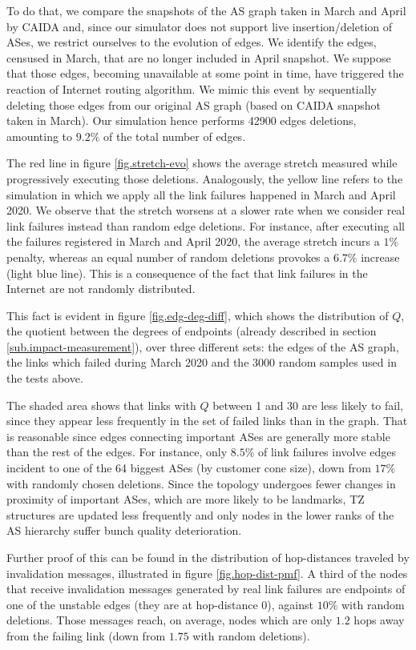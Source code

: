 \documentclass[a4paper,11pt,oneside]{report}
\begin{document}
To do that, we compare the snapshots of the AS graph taken in March and April by CAIDA and, since our simulator does not support live insertion/deletion of ASes, we restrict ourselves to the evolution of edges. We identify the edges, censused in March, that are no longer included in April snapshot. We suppose that those edges, becoming unavailable at some point in time, have triggered the reaction of Internet routing algorithm. We mimic this event by sequentially deleting those edges from our original AS graph (based on CAIDA snapshot taken in March). Our simulation hence performs 42900 edges deletions, amounting to $9.2\%$ of the total number of edges. 

The red line in figure \ref{fig.stretch-evo} shows the average stretch measured while progressively executing those deletions. Analogously, the yellow line refers to the simulation in which we apply all the link failures happened in March and April 2020.
We observe that the stretch worsens at a slower rate when we consider real link failures instead than random edge deletions. For instance, after executing all the failures registered in March and April 2020, the average stretch incurs a $1\%$ penalty, whereas an equal number of random deletions provokes a $6.7\%$ increase (light blue line).
This is a consequence of the fact that link failures in the Internet are not randomly distributed.

\bigskip
This fact is evident in figure \ref{fig.edg-deg-diff}, which shows the distribution of $Q$, the quotient between the degrees of endpoints (already described in section \ref{sub.impact-measurement}), over three different sets: the edges of the AS graph, the links which failed during March 2020 and the 3000 random samples used in the tests above.

The shaded area shows that links with $Q$ between 1 and 30 are less likely to fail, since they appear less frequently in the set of failed links than in the graph. That is reasonable since edges connecting important ASes are generally more stable than the rest of the edges.
For instance, only $8.5\%$ of link failures involve edges incident to one of the 64 biggest ASes (by customer cone size), down from $17\%$ with randomly chosen deletions. Since the topology undergoes fewer changes in proximity of important ASes, which are more likely to be landmarks, TZ structures are updated less frequently and only nodes in the lower ranks of the AS hierarchy suffer bunch quality deterioration. 

Further proof of this can be found in the distribution of hop-distances traveled by invalidation messages, illustrated in figure \ref{fig.hop-dist-pmf}. A third of the nodes that receive invalidation messages generated by real link failures are endpoints of one of the unstable edges (they are at hop-distance $0$), against $10\%$ with random deletions. Those messages reach, on average, nodes which are only $1.2$ hops away from the failing link (down from $1.75$ with random deletions).
\end{document}
